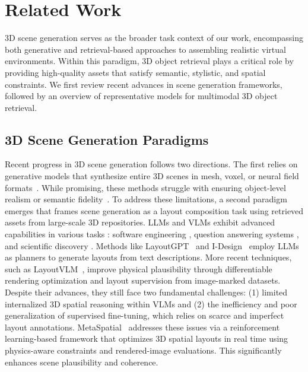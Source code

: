 \section{Related Work}
3D scene generation serves as the broader task context of our work, encompassing both generative and retrieval-based approaches to assembling realistic virtual environments. Within this paradigm, 3D object retrieval plays a critical role by providing high-quality assets that satisfy semantic, stylistic, and spatial constraints. We first review recent advances in scene generation frameworks, followed by an overview of representative models for multimodal 3D object retrieval.


\subsection{3D Scene Generation Paradigms}

Recent progress in 3D scene generation follows two directions. The first relies on generative models that synthesize entire 3D scenes in mesh, voxel, or neural field formats~\cite{schult2024controlroom3d}. While promising, these methods struggle with ensuring object-level realism or semantic fidelity~\cite{fang2023ctrl}. To address these limitations, a second paradigm emerges that frames scene generation as a layout composition task using retrieved assets from large-scale 3D repositories. LLMs and VLMs exhibit advanced capabilities in various tasks \cite{pan2025evomarlcoevolutionarymultiagentreinforcement,pan2025advevomarlshapinginternalizedsafety,pan2025fairreasonbalancingreasoningsocial}: software engineering \citep{pan2025code,pan2024codevbenchllmsunderstanddevelopercentric}, question answering systems \citep{pan2024chain,pan2024convcoaimprovingopendomainquestion}, and scientific discovery \citep{shao2025sciscigpt}. Methods like LayoutGPT~\cite{feng2023layoutgpt} and I-Design~\cite{ccelen2024design} employ LLMs as planners to generate layouts from text descriptions. More recent techniques, such as LayoutVLM~\cite{sun2024layoutvlm}, improve physical plausibility through differentiable rendering optimization and layout supervision from image-marked datasets. Despite their advances, they still face two fundamental challenges: (1) limited internalized 3D spatial reasoning within VLMs and (2) the inefficiency and poor generalization of supervised fine-tuning, which relies on scarce and imperfect layout annotations. MetaSpatial~\cite{pan2025metaspatial} addresses these issues via a reinforcement learning-based framework that optimizes 3D spatial layouts in real time using physics-aware constraints and rendered-image evaluations. This significantly enhances scene plausibility and coherence.

